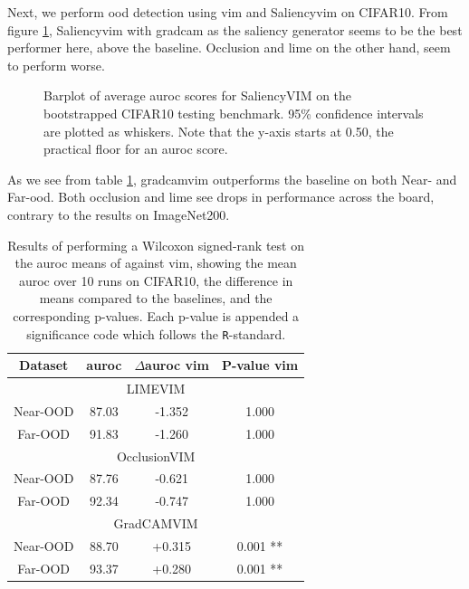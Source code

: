 \documentclass[UKenglish]{uiomasterthesis} %
\theoremstyle{definition}
\begin{document}
Next, we perform \ac{ood} detection using \ac{vim} and Saliency\ac{vim} on CIFAR10. From figure \ref{fig:cifar10_salvim_bootstrap_barplot}, Saliency\ac{vim} with \ac{gradcam} as the saliency generator seems to be the best performer here, above the baseline. Occlusion and \ac{lime} on the other hand, seem to perform worse.

\begin{figure}[hbtp]
    \begin{center}
        
    \end{center}
    \caption[CIFAR10 SaliencyVIM Bootstrap]{Barplot of average \ac{auroc} scores for SaliencyVIM on the bootstrapped CIFAR10 testing benchmark. 95\% confidence intervals are plotted as whiskers. Note that the y-axis starts at 0.50, the practical floor for an \ac{auroc} score.}
    \label{fig:cifar10_salvim_bootstrap_barplot}
\end{figure}

As we see from table \ref{table:cifar10_salvim_ttest}, \ac{gradcam}\ac{vim} outperforms the baseline on both Near- and Far-\ac{ood}. Both occlusion and \ac{lime} see drops in performance across the board, contrary to the results on ImageNet200.

\begin{table}[hbtp]
\setlength\tabcolsep{3pt}
\begin{center}
\begin{tabular}{ |c|c|c|c| }
    \hline
    Dataset & \ac{auroc} & $\Delta$\ac{auroc} \ac{vim} & P-value \ac{vim} \\
    \hline
    \hline
    \multicolumn{4}{|c|}{LIMEVIM} \\
    \hline
    \rowcolor{near!50}
    Near-OOD & 87.03 & -1.352 & 1.000 \\
    \rowcolor{far!50}
    Far-OOD & 91.83 & -1.260 & 1.000 \\
    \hline
    \hline
    \multicolumn{4}{|c|}{OcclusionVIM} \\
    \hline
    \rowcolor{near!50}
    Near-OOD & 87.76 & -0.621 & 1.000 \\
    \rowcolor{far!50}
    Far-OOD & 92.34 & -0.747 & 1.000 \\
    \hline
    \hline
    \multicolumn{4}{|c|}{GradCAMVIM} \\
    \hline
    \rowcolor{near!50}
    Near-OOD & 88.70 & +0.315 & 0.001 ** \\
    \rowcolor{far!50}
    Far-OOD & 93.37 & +0.280 & 0.001 ** \\
    \hline
    \end{tabular}
    \caption[Wilcoxon signed-rank test for SaliencyVIM on CIFAR10]{Results of performing a Wilcoxon signed-rank test on the \ac{auroc} means of against \ac{vim}, showing the mean \ac{auroc} over 10 runs on CIFAR10, the difference in means compared to the baselines, and the corresponding p-values. Each p-value is appended a significance code which follows the \texttt{R}-standard.}
    \label{table:cifar10_salvim_ttest}
\end{center}
\setlength\tabcolsep{6pt}
\end{table}
\end{document}

